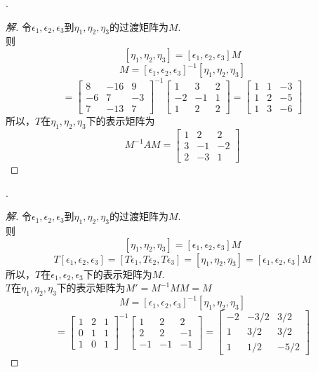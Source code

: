 \documentclass[10pt,a4paper]{report}
\begin{document}
.
\begin{proof}[解]
	令$\epsilon_{1},\epsilon_{2},\epsilon_{3}$到$\eta_{1},\eta_{2},\eta_{3}$的过渡矩阵为$M$.\\
	则$$[\eta_{1},\eta_{2},\eta_{3}] = [\epsilon_{1},\epsilon_{2},\epsilon_{3}]M$$
	$$M=[\epsilon_{1},\epsilon_{2},\epsilon_{3}]^{-1}[\eta_{1},\eta_{2},\eta_{3}]$$
	$$=\left[
	\begin{matrix}
	8 & -16 & 9\\
	-6 & 7 & -3 \\
	7 & -13 & 7
	\end{matrix}
	\right]^{-1}\left[
	\begin{matrix}
	1 & 3 & 2\\
	-2 & -1 & 1 \\
	1 & 2 & 2
	\end{matrix}
	\right] = \left[
	\begin{matrix}
	1 & 1 & -3\\
	1 & 2 & -5 \\
	1 & 3 & -6
	\end{matrix}
	\right]$$
	所以，$T$在$\eta_{1},\eta_{2},\eta_{3}$下的表示矩阵为
	$$
	M^{-1}AM=\left[
	\begin{matrix}
	1 & 2 & 2\\
	3 & -1 & -2 \\
	2 & -3 & 1
	\end{matrix}
	\right]
	$$
\end{proof}
.
\begin{proof}[解]
	令$\epsilon_{1},\epsilon_{2},\epsilon_{3}$到$\eta_{1},\eta_{2},\eta_{3}$的过渡矩阵为$M$.\\
	则$$[\eta_{1},\eta_{2},\eta_{3}] = [\epsilon_{1},\epsilon_{2},\epsilon_{3}]M$$
	$$T[\epsilon_{1},\epsilon_{2},\epsilon_{3}] = [T\epsilon_{1},T\epsilon_{2},T\epsilon_{3}] = [\eta_{1},\eta_{2},\eta_{3}] = [\epsilon_{1},\epsilon_{2},\epsilon_{3}]M$$
	所以，$T$在$\epsilon_{1},\epsilon_{2},\epsilon_{3}$下的表示矩阵为$M$.\\
	$T$在$\eta_{1},\eta_{2},\eta_{3}$下的表示矩阵为$M' = M^{-1}MM = M$\\
	$$M=[\epsilon_{1},\epsilon_{2},\epsilon_{3}]^{-1}[\eta_{1},\eta_{2},\eta_{3}]$$
	$$ = \left[
	\begin{matrix}
	1 & 2 & 1\\
	0 & 1 & 1 \\
	1 & 0 & 1
	\end{matrix}
	\right]^{-1}\left[
	\begin{matrix}
	1 & 2 & 2\\
	2 & 2 & -1 \\
	-1 & -1 & -1
	\end{matrix}
	\right] = \left[
	\begin{matrix}
	-2 & -3/2 & 3/2\\
	1 & 3/2 & 3/2 \\
	1 & 1/2 & -5/2
	\end{matrix}
	\right]$$
\end{proof}
\end{document}
